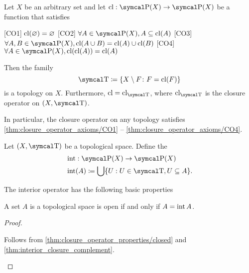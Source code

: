 \begin{proposition}\label{thm:closure_operator_axioms}\cite[14]{Engelking1989}
  Let \( X \) be an arbitrary set and let \( \Cl: \Power(X) \to \Power(X) \) be a function that satisfies
  \begin{description}
    [CO1] \( \operatorname{cl}(\varnothing) = \varnothing \)
    [CO2] \( \forall A \in \Power(X), A \subseteq \Cl(A) \)
    [CO3] \( \forall A, B \in \Power(X), \Cl(A \cup B) = \Cl(A) \cup \Cl(B) \)
    [CO4] \( \forall A \in \Power(X), \Cl(\Cl(A)) = \Cl(A) \)
  \end{description}

  Then the family
  \begin{equation*}
    \CT \coloneqq \{ X \setminus F \colon F = \Cl(F) \}
  \end{equation*}
  is a topology on \( X \). Furthermore, \( \Cl = \Cl_{\CT} \), where \( \Cl_{\CT} \) is the closure operator on \( (X, \CT) \).

  In particular, the closure operator on any topology satisfies \cref{thm:closure_operator_axioms/CO1} -- \cref{thm:closure_operator_axioms/CO4}.
\end{proposition}

\begin{definition}\label{def:interior_operator}\cite[15]{Engelking1989}
  Let \( (X, \CT) \) be a topological space. Define the 
  \begin{align*}
    &\Int: \Power(X) \to \Power(X) \\
    &\Int(A) \coloneqq \bigcup \{ U : U \in \CT, U \subseteq A \}.
  \end{align*}
\end{definition}

\begin{proposition}\label{thm:interior_operator_properties}
  The interior operator has the following basic properties
  \begin{propenum}
     A set \( A \) is a topological space is open if and only if \( A = \operatorname{int} A \).
  \end{propenum}
\end{proposition}
\begin{proof}
  \begin{description}
     Follows from \cref{thm:closure_operator_properties/closed} and \cref{thm:interior_closure_complement}.
  \end{description}
\end{proof}

